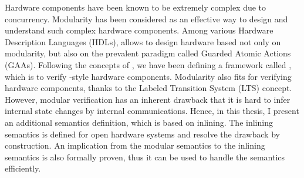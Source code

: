 % 
% 
%

Hardware components have been known to be extremely complex due to
concurrency. Modularity has been considered as an effective way to
design and understand such complex hardware components. Among various
Hardware Description Languages (HDLs), \Bluespec{} allows to design
hardware based not only on modularity, but also on the prevalent
paradigm called Guarded Atomic Actions (GAAs). Following the concepts
of \Bluespec{}, we have been defining a framework called \Kami{},
which is to verify \Bluespec{}-style hardware components. Modularity
also fits for verifying hardware components, thanks to the Labeled
Transition System (LTS) concept. However, modular verification has an
inherent drawback that it is hard to infer internal state changes by
internal communications. Hence, in this thesis, I present an
additional semantics definition, which is based on inlining. The
inlining semantics is defined for open hardware systems and resolve
the drawback by construction. An implication from the modular
semantics to the inlining semantics is also formally proven, thus it
can be used to handle the semantics efficiently.

